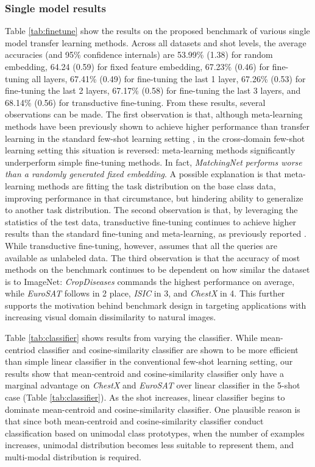 \documentclass[runningheads]{llncs}
\begin{document}
\subsubsection{Single model results}
\label{subsec:single}
Table \ref{tab:finetune} show the results on the proposed benchmark of various single model transfer learning methods. Across all datasets and shot levels, the average accuracies (and 95\% confidence internals) are 53.99\% (1.38) for random embedding, 64.24 (0.59) for fixed feature embedding, 67.23\% (0.46) for fine-tuning all layers, 67.41\% (0.49) for fine-tuning the last 1 layer, 67.26\% (0.53) for fine-tuning the last 2 layers, 67.17\% (0.58) for fine-tuning the last 3 layers, and 68.14\% (0.56) for transductive fine-tuning.  From these results, several observations can be made. The first observation is that, although meta-learning methods have been previously shown to achieve higher performance than transfer learning in the standard few-shot learning setting \cite{vinyals2016matching,chen2018a}, in the cross-domain few-shot learning setting this situation is reversed: meta-learning methods significantly underperform simple fine-tuning methods. In fact, \emph{ MatchingNet performs worse than a randomly generated fixed embedding}. A possible explanation is that meta-learning methods are fitting the task distribution on the base class data, improving performance in that circumstance, but hindering ability to generalize to another task distribution. The second observation is that, by leveraging the statistics of the test data, transductive fine-tuning continues to achieve higher results than the standard fine-tuning and meta-learning, as previously reported \cite{dhillonfsbaseline}. While transductive fine-tuning, however, assumes that all the queries are available as unlabeled data. The third observation is that the accuracy of most methods on the benchmark continues to be dependent on how similar the dataset is to ImageNet: \textit{CropDiseases} commands the highest performance on average, while \textit{EuroSAT} follows in 2 place, \textit{ISIC} in 3, and \textit{ChestX} in 4. This further supports the motivation behind benchmark design in targeting applications with increasing visual domain dissimilarity to natural images. 

Table \ref{tab:classifier} shows results from varying the classifier. While mean-centriod classifier and cosine-similarity classifier are shown to be more efficient than simple linear classifier in the conventional few-shot learning setting, our results show that mean-centroid and cosine-similarity classifier only have a marginal advantage on \textit{ChestX} and \textit{EuroSAT} over linear classifier in the 5-shot case (Table \ref{tab:classifier}). As the shot increases, linear classifier begins to dominate mean-centroid and cosine-similarity classifier. One plausible reason is that since both mean-centroid and cosine-similarity classifier conduct classification based on unimodal class prototypes, when the number of examples increases, unimodal distribution becomes less suitable to represent them, and multi-modal distribution is required.
\end{document}
